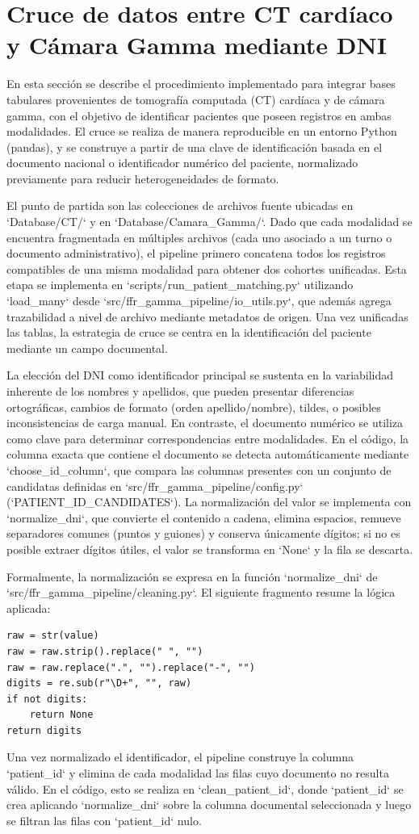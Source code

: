 \section{Cruce de datos entre CT cardíaco y Cámara Gamma mediante DNI}
En esta sección se describe el procedimiento implementado para integrar bases tabulares provenientes de tomografía computada (CT) cardíaca y de cámara gamma, con el objetivo de identificar pacientes que poseen registros en ambas modalidades. El cruce se realiza de manera reproducible en un entorno Python (pandas), y se construye a partir de una clave de identificación basada en el documento nacional o identificador numérico del paciente, normalizado previamente para reducir heterogeneidades de formato.

El punto de partida son las colecciones de archivos fuente ubicadas en `Database/CT/` y en `Database/Camara_Gamma/`. Dado que cada modalidad se encuentra fragmentada en múltiples archivos (cada uno asociado a un turno o documento administrativo), el pipeline primero concatena todos los registros compatibles de una misma modalidad para obtener dos cohortes unificadas. Esta etapa se implementa en `scripts/run_patient_matching.py` utilizando `load_many` desde `src/ffr_gamma_pipeline/io_utils.py`, que además agrega trazabilidad a nivel de archivo mediante metadatos de origen. Una vez unificadas las tablas, la estrategia de cruce se centra en la identificación del paciente mediante un campo documental.

La elección del DNI como identificador principal se sustenta en la variabilidad inherente de los nombres y apellidos, que pueden presentar diferencias ortográficas, cambios de formato (orden apellido/nombre), tildes, o posibles inconsistencias de carga manual. En contraste, el documento numérico se utiliza como clave para determinar correspondencias entre modalidades. En el código, la columna exacta que contiene el documento se detecta automáticamente mediante `choose_id_column`, que compara las columnas presentes con un conjunto de candidatas definidas en `src/ffr_gamma_pipeline/config.py` (`PATIENT_ID_CANDIDATES`). La normalización del valor se implementa con `normalize_dni`, que convierte el contenido a cadena, elimina espacios, remueve separadores comunes (puntos y guiones) y conserva únicamente dígitos; si no es posible extraer dígitos útiles, el valor se transforma en `None` y la fila se descarta.

Formalmente, la normalización se expresa en la función `normalize_dni` de `src/ffr_gamma_pipeline/cleaning.py`. El siguiente fragmento resume la lógica aplicada:
\begin{verbatim}
raw = str(value)
raw = raw.strip().replace(" ", "")
raw = raw.replace(".", "").replace("-", "")
digits = re.sub(r"\D+", "", raw)
if not digits:
    return None
return digits
\end{verbatim}
Una vez normalizado el identificador, el pipeline construye la columna `patient_id` y elimina de cada modalidad las filas cuyo documento no resulta válido. En el código, esto se realiza en `clean_patient_id`, donde `patient_id` se crea aplicando `normalize_dni` sobre la columna documental seleccionada y luego se filtran las filas con `patient_id` nulo.

